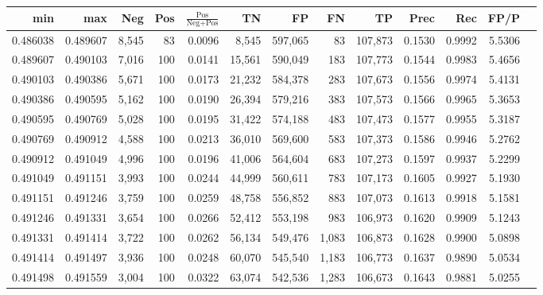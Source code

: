 \begin{tabular}{rrrrrrrrrrrrr}
\toprule
     min &      max &   Neg & Pos & $\frac{\text{Pos}}{\text{Neg}+\text{Pos}}$ &      TN &      FP &      FN &      TP &   Prec &    Rec &   FP/P \\
\midrule
0.486038 & 0.489607 & 8,545 &  83 &                                     0.0096 &   8,545 & 597,065 &      83 & 107,873 & 0.1530 & 0.9992 & 5.5306 \\
0.489607 & 0.490103 & 7,016 & 100 &                                     0.0141 &  15,561 & 590,049 &     183 & 107,773 & 0.1544 & 0.9983 & 5.4656 \\
0.490103 & 0.490386 & 5,671 & 100 &                                     0.0173 &  21,232 & 584,378 &     283 & 107,673 & 0.1556 & 0.9974 & 5.4131 \\
0.490386 & 0.490595 & 5,162 & 100 &                                     0.0190 &  26,394 & 579,216 &     383 & 107,573 & 0.1566 & 0.9965 & 5.3653 \\
0.490595 & 0.490769 & 5,028 & 100 &                                     0.0195 &  31,422 & 574,188 &     483 & 107,473 & 0.1577 & 0.9955 & 5.3187 \\
0.490769 & 0.490912 & 4,588 & 100 &                                     0.0213 &  36,010 & 569,600 &     583 & 107,373 & 0.1586 & 0.9946 & 5.2762 \\
0.490912 & 0.491049 & 4,996 & 100 &                                     0.0196 &  41,006 & 564,604 &     683 & 107,273 & 0.1597 & 0.9937 & 5.2299 \\
0.491049 & 0.491151 & 3,993 & 100 &                                     0.0244 &  44,999 & 560,611 &     783 & 107,173 & 0.1605 & 0.9927 & 5.1930 \\
0.491151 & 0.491246 & 3,759 & 100 &                                     0.0259 &  48,758 & 556,852 &     883 & 107,073 & 0.1613 & 0.9918 & 5.1581 \\
0.491246 & 0.491331 & 3,654 & 100 &                                     0.0266 &  52,412 & 553,198 &     983 & 106,973 & 0.1620 & 0.9909 & 5.1243 \\
0.491331 & 0.491414 & 3,722 & 100 &                                     0.0262 &  56,134 & 549,476 &   1,083 & 106,873 & 0.1628 & 0.9900 & 5.0898 \\
0.491414 & 0.491497 & 3,936 & 100 &                                     0.0248 &  60,070 & 545,540 &   1,183 & 106,773 & 0.1637 & 0.9890 & 5.0534 \\
0.491498 & 0.491559 & 3,004 & 100 &                                     0.0322 &  63,074 & 542,536 &   1,283 & 106,673 & 0.1643 & 0.9881 & 5.0255 \\

\end{tabular}
